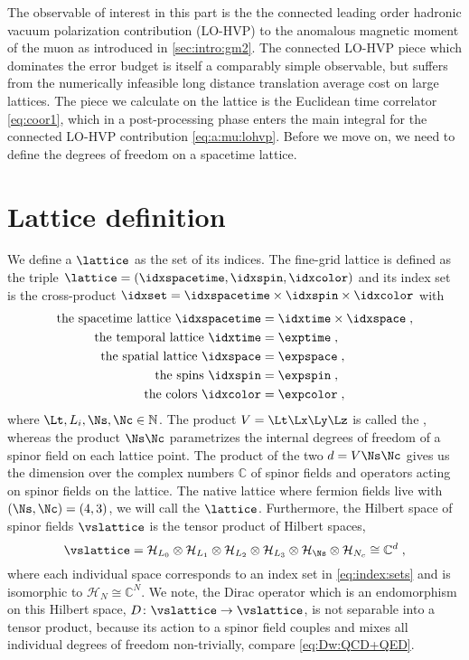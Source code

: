 The observable of interest in this part is the the connected leading order hadronic vacuum polarization contribution (LO-HVP) to the anomalous magnetic moment of the muon as introduced in \cref{sec:intro:gm2}.
The connected LO-HVP piece which dominates the error budget is itself a comparably simple observable, but suffers from the numerically infeasible long distance translation average cost on large lattices.
The piece we calculate on the lattice is the Euclidean time correlator \cref{eq:coor1}, which in a post-processing phase enters the main integral for the connected LO-HVP contribution \cref{eq:a:mu:lohvp}.
Before we move on, we need to define the degrees of freedom on a spacetime lattice.

\section{Lattice definition}
\label{sec:lattice:definition}

We define a  $\lattice$ as the set of its indices.
The fine-grid lattice is defined as the triple $\lattice = (\idxspacetime, \idxspin, \idxcolor)$ and its index set is the cross-product $\idxset = \idxspacetime \times \idxspin \times \idxcolor$ with
\begin{align}
\begin{aligned}
\text{the spacetime lattice }
    \idxspacetime &= \idxtime \times \idxspace \;, \\
\text{the temporal lattice }
    \idxtime  &= \exptime \;, \\
\text{the spatial lattice }
    \idxspace &= \expspace \;, \\
\text{the spins }
    \idxspin  &= \expspin \;, \\
\text{the colors }
    \idxcolor &= \expcolor \;,
\end{aligned} \label{eq:index:sets}
\end{align}
where $\Lt,L_i,\Ns,\Nc \in \mathbb{N}$.
The product $V = \Lt \Lx \Ly \Lz$ is called the , whereas the product $\Ns \Nc$ parametrizes the internal degrees of freedom of a spinor field on each lattice point.
The product of the two $d = V \Ns \Nc$ gives us the dimension over the complex numbers $\mathbb{C}$ of spinor fields and operators acting on spinor fields on the lattice.
The native lattice where fermion fields live with $(\Ns, \Nc) = (4,3)$, we will call the  $\lattice$.
Furthermore, the Hilbert space of spinor fields $\vslattice$ is the tensor product of Hilbert spaces,
\begin{equation}
\vslattice = \mathcal{H}_{L_0} \otimes \mathcal{H}_{L_1} \otimes \mathcal{H}_{L_2} \otimes \mathcal{H}_{L_3} \otimes \mathcal{H}_{\Ns} \otimes \mathcal{H}_{N_c} \cong \mathbb{C}^{d} \;,
\end{equation}
where each individual space corresponds to an index set in \cref{eq:index:sets} and is isomorphic to $\mathcal{H}_{N} \cong \mathbb{C}^{N}$.
We note, the Dirac operator which is an endomorphism on this Hilbert space, $D \colon \vslattice \rightarrow \vslattice$, is not separable into a tensor product, because its action to a spinor field couples and mixes all individual degrees of freedom non-trivially, compare \cref{eq:Dw:QCD+QED}.

